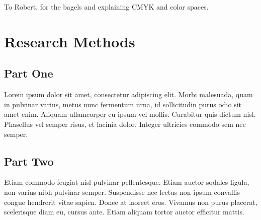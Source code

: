 \documentclass[sigconf,authordraft]{acmart}
\begin{document}
\begin{acks}
To Robert, for the bagels and explaining CMYK and color spaces.
\end{acks}





\appendix

\section{Research Methods}

\subsection{Part One}

Lorem ipsum dolor sit amet, consectetur adipiscing elit. Morbi
malesuada, quam in pulvinar varius, metus nunc fermentum urna, id
sollicitudin purus odio sit amet enim. Aliquam ullamcorper eu ipsum
vel mollis. Curabitur quis dictum nisl. Phasellus vel semper risus, et
lacinia dolor. Integer ultricies commodo sem nec semper.

\subsection{Part Two}

Etiam commodo feugiat nisl pulvinar pellentesque. Etiam auctor sodales
ligula, non varius nibh pulvinar semper. Suspendisse nec lectus non
ipsum convallis congue hendrerit vitae sapien. Donec at laoreet
eros. Vivamus non purus placerat, scelerisque diam eu, cursus
ante. Etiam aliquam tortor auctor efficitur mattis.
\end{document}

